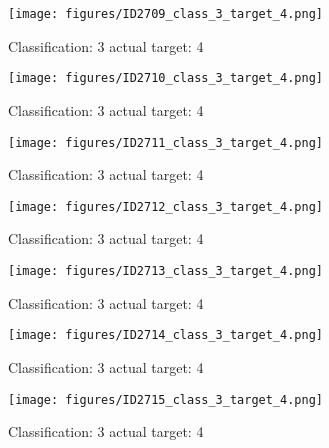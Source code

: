 \begin{figure}[h!]
\begin{center}
\texttt{[image: figures/ID2709\_class\_3\_target\_4.png]}
\end{center}
\caption{ Classification: 3 actual target: 4}
\label{fig:ID2709_class_3_target_4}
\end{figure}
\begin{figure}[h!]
\begin{center}
\texttt{[image: figures/ID2710\_class\_3\_target\_4.png]}
\end{center}
\caption{ Classification: 3 actual target: 4}
\label{fig:ID2710_class_3_target_4}
\end{figure}
\begin{figure}[h!]
\begin{center}
\texttt{[image: figures/ID2711\_class\_3\_target\_4.png]}
\end{center}
\caption{ Classification: 3 actual target: 4}
\label{fig:ID2711_class_3_target_4}
\end{figure}
\begin{figure}[h!]
\begin{center}
\texttt{[image: figures/ID2712\_class\_3\_target\_4.png]}
\end{center}
\caption{ Classification: 3 actual target: 4}
\label{fig:ID2712_class_3_target_4}
\end{figure}
\begin{figure}[h!]
\begin{center}
\texttt{[image: figures/ID2713\_class\_3\_target\_4.png]}
\end{center}
\caption{ Classification: 3 actual target: 4}
\label{fig:ID2713_class_3_target_4}
\end{figure}
\begin{figure}[h!]
\begin{center}
\texttt{[image: figures/ID2714\_class\_3\_target\_4.png]}
\end{center}
\caption{ Classification: 3 actual target: 4}
\label{fig:ID2714_class_3_target_4}
\end{figure}
\begin{figure}[h!]
\begin{center}
\texttt{[image: figures/ID2715\_class\_3\_target\_4.png]}
\end{center}
\caption{ Classification: 3 actual target: 4}
\label{fig:ID2715_class_3_target_4}
\end{figure}
